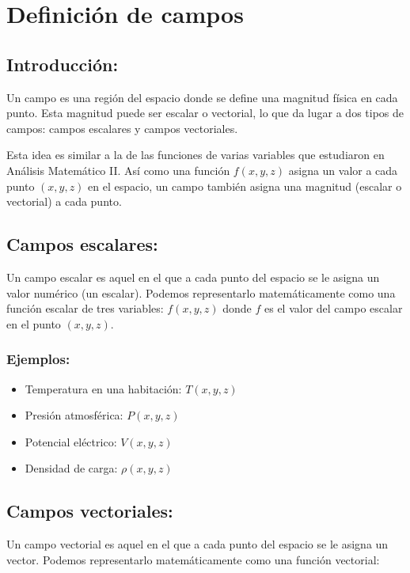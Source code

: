\documentclass{book}
\begin{document}

\section{Definición de campos}

\subsection{Introducción:}

Un campo es una región del espacio donde se define una magnitud física en cada punto. Esta magnitud puede ser escalar o vectorial, lo que da lugar a dos tipos de campos: campos escalares y campos vectoriales.

Esta idea es similar a la de las funciones de varias variables que estudiaron en Análisis Matemático II. Así como una función $f(x, y, z)$ asigna un valor a cada punto $(x, y, z)$ en el espacio, un campo también asigna una magnitud (escalar o vectorial) a cada punto.

\subsection{Campos escalares:}

Un campo escalar es aquel en el que a cada punto del espacio se le asigna un valor numérico (un escalar). Podemos representarlo matemáticamente como una función escalar de tres variables: $f(x, y, z)$ donde $f$ es el valor del campo escalar en el punto $(x, y, z)$.

\subsubsection{Ejemplos:}
\begin{itemize}
    \item [\textbullet]Temperatura en una habitación: $T(x, y, z)$
    \item [\textbullet]Presión atmosférica: $P(x, y, z)$
    \item [\textbullet]Potencial eléctrico: $V(x, y, z)$
    \item [\textbullet]Densidad de carga: $\rho(x, y, z)$
\end{itemize}

\subsection{Campos vectoriales:}

Un campo vectorial es aquel en el que a cada punto del espacio se le asigna un vector. Podemos representarlo matemáticamente como una función vectorial:
\end{document}
